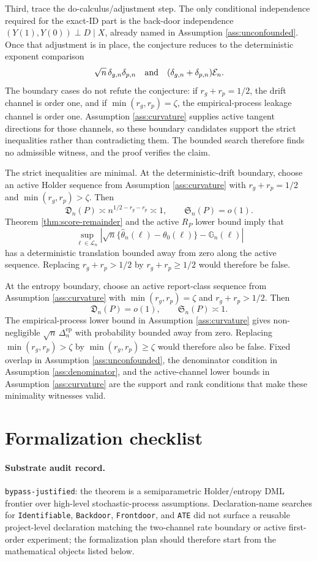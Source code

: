\documentclass[11pt]{article}
\theoremstyle{definition}
\theoremstyle{plain}
\theoremstyle{remark}
\begin{document}
Third, trace the do-calculus/adjustment step.  The only conditional
independence required for the exact-ID part is the back-door independence
\((Y(1),Y(0))\perp D\mid X\), already named in Assumption
\ref{ass:unconfounded}.  Once that adjustment is in place, the conjecture
reduces to the deterministic exponent comparison
\[
\sqrt n\,\delta_{g,n}\delta_{p,n}
\quad\hbox{and}\quad
(\delta_{g,n}+\delta_{p,n})\mathcal{E}_n.
\]
The boundary cases do not refute the conjecture: if \(r_g+r_p=1/2\), the
drift channel is order one, and if \(\min(r_g,r_p)=\zeta\), the
empirical-process leakage channel is order one.  Assumption
\ref{ass:curvature} supplies active tangent directions for those channels, so
these boundary candidates support the strict inequalities rather than
contradicting them.  The bounded search therefore finds no admissible witness,
and the proof verifies the claim.

The strict inequalities are minimal.  At the deterministic-drift boundary,
choose an active Holder sequence from Assumption \ref{ass:curvature} with
\(r_g+r_p=1/2\) and \(\min(r_g,r_p)>\zeta\).  Then
\[
\mathfrak D_n(P)\asymp n^{1/2-r_g-r_p}\asymp1,
\qquad
\mathfrak S_n(P)=o(1).
\]
Theorem \ref{thm:score-remainder} and the active \(R_P\) lower bound imply
that
\[
\sup_{\ell\in\mathcal L_n}
\left|
\sqrt n\{\hat\theta_n(\ell)-\theta_0(\ell)\}-\mathbb G_n(\ell)
\right|
\]
has a deterministic translation bounded away from zero along the active
sequence.  Replacing \(r_g+r_p>1/2\) by \(r_g+r_p\ge1/2\) would therefore be
false.

At the entropy boundary, choose an active report-class sequence from
Assumption \ref{ass:curvature} with \(\min(r_g,r_p)=\zeta\) and
\(r_g+r_p>1/2\).  Then
\[
\mathfrak D_n(P)=o(1),
\qquad
\mathfrak S_n(P)\asymp1.
\]
The empirical-process lower bound in Assumption \ref{ass:curvature} gives
non-negligible \(\sqrt n\,\Delta_n^{\mathrm{ep}}\) with probability bounded
away from zero.  Replacing \(\min(r_g,r_p)>\zeta\) by
\(\min(r_g,r_p)\ge\zeta\) would therefore also be false.  Fixed overlap in
Assumption \ref{ass:unconfounded}, the denominator condition in Assumption
\ref{ass:denominator}, and the active-channel lower bounds in Assumption
\ref{ass:curvature} are the support and rank conditions that make these
minimality witnesses valid.

\section{Formalization checklist}
\paragraph{Substrate audit record.}
\texttt{bypass-justified}: the theorem is a semiparametric
Holder/entropy DML frontier over high-level stochastic-process assumptions.
Declaration-name searches for \texttt{Identifiable}, \texttt{Backdoor},
\texttt{Frontdoor}, and \texttt{ATE} did not surface a reusable
project-level declaration matching the two-channel rate boundary or active
first-order experiment; the formalization plan should therefore start from
the mathematical objects listed below.
\end{document}
